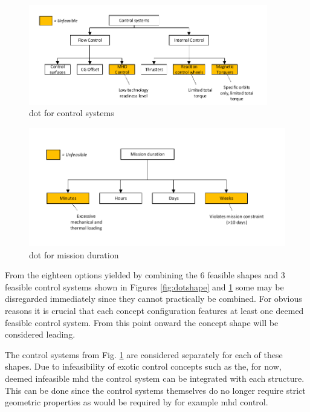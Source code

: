 \begin{figure}[H]
\centering
\includegraphics[width = 0.93\textwidth]{Figure/DOT_control.pdf}
\vspace{-5mm}
\caption{\acrlong{dot} for control systems}
\label{fig:dotcontrol}
\end{figure}

\begin{figure}[H]
\centering
\includegraphics[width = 1.0\textwidth]{Figure/DOT_missionduration.pdf}
\vspace{-5mm}
\caption{\acrlong{dot} for mission duration}
\label{fig:dotduration}
\end{figure}

From the eighteen options yielded by combining the 6 feasible shapes and 3 feasible control systems shown in Figures \ref{fig:dotshape} and \ref{fig:dotcontrol} some may be disregarded immediately since they cannot practically be combined. For obvious reasons it is crucial that each concept configuration features at least one deemed feasible control system. From this point onward the concept shape will be considered leading. 

The control systems from Fig. \ref{fig:dotcontrol} are considered separately for each of these shapes. Due to infeasibility of exotic control concepts such as the, for now, deemed infeasible \gls{mhd} the control system can be integrated with each structure. This can be done since the control systems themselves do no longer require strict geometric properties as would be required by for example \gls{mhd} control.

